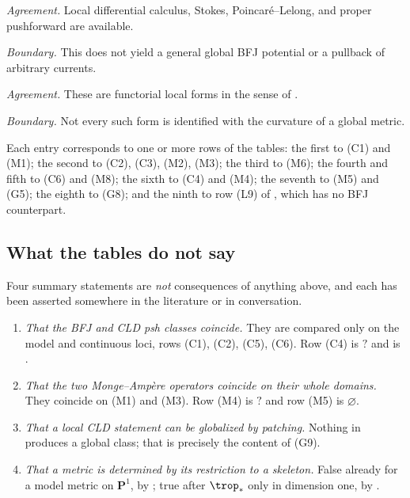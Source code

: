 \begin{description}[style=nextline,leftmargin=0pt,labelindent=0pt,
  labelsep=0pt,itemsep=.8\baselineskip,font=\normalfont\bfseries]
\item[CLD smooth forms and currents]
\emph{Agreement.} Local differential calculus, Stokes,
Poincar\'e--Lelong, and proper pushforward are available.
\par\emph{Boundary.} This does not yield a general global BFJ potential or a
pullback of arbitrary currents.

\item[Harmonic tropicalization forms]
\emph{Agreement.} These are functorial local forms in the sense of
\cite{GJR26}.
\par\emph{Boundary.} Not every such form is identified with the curvature of
a global metric.
\end{description}

Each entry corresponds to one or more rows of the tables: the first to (C1)
and (M1); the second to (C2), (C3), (M2), (M3); the third to (M6); the
fourth and fifth to (C6) and (M8); the sixth to (C4) and (M4); the seventh
to (M5) and (G5); the eighth to (G8); and the ninth to row \textup{(L9)} of
, which has no BFJ counterpart.

\subsection{What the tables do not say}
\label{sec:ch31-table-not}

Four summary statements are \emph{not} consequences of anything above, and
each has been asserted somewhere in the literature or in conversation.

\begin{enumerate}
\item\label{itm:ch31-not:classes}
 \emph{That the BFJ and CLD psh classes coincide.}  They are compared only
 on the model and continuous loci, rows (C1), (C2), (C5), (C6).  Row (C4)
 is \(?\) and is .
\item\label{itm:ch31-not:operators}
 \emph{That the two Monge--Amp\`ere operators coincide on their whole
 domains.}  They coincide on (M1) and (M3).  Row (M4) is \(?\) and row
 (M5) is \(\varnothing\).
\item\label{itm:ch31-not:local}
 \emph{That a local CLD statement can be globalized by patching.}  Nothing
 in  produces a global class; that is precisely the content
 of (G9).
\item\label{itm:ch31-not:skeleton}
 \emph{That a metric is determined by its restriction to a skeleton.}
 False already for a model metric on \(\mathbf P^1\), by
 ; true after \(\trop_*\) only in dimension one,
 by .
\end{enumerate}

